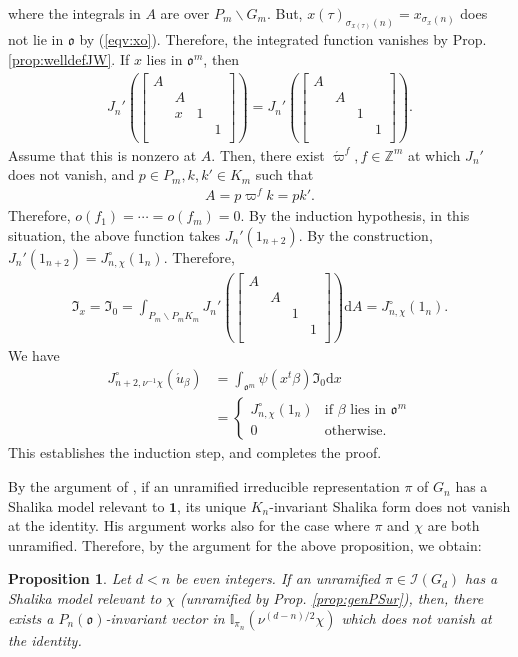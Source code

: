 \documentclass[11pt]{amsart}
\newcommand\s{\sigma}%
\newcommand\Vp{\varpi}%
\newcommand\vp{\varphi}%
\newcommand\oo{\mathfrak{o}}
\newcommand\If{\mathfrak{I}}
\newcommand\dr{\mathrm{d}}
\newcommand\Z{{\mathbb{Z}}}
\newcommand\Ib{{\mathbb{I}}}
\newcommand\1{\mathbf{1}}
\newcommand\ac{\acute}
\newcommand\bs{\backslash}%
\newcommand\Ir{{\mathscr{I}}}
\numberwithin{equation}{section}
\newtheorem{prop}[thm]{Proposition}
\begin{document}
where the integrals in $A$ are over $P_m \bs G_{m}$. 
But, $x(\tau)_{\s_{x(\tau)}(n)} = x_{\s_x(n)}$ does not lie in $\oo$ by (\ref{eqv:xo}).
Therefore, the integrated function vanishes by Prop. \ref{prop:welldefJW}.
If $x$ lies in $\oo^m$, then 
\begin{align*}
J_n'(\begin{bmatrix}
A & & &  \\
&A & & \\
& x & 1 &  \\
& & &1  \\
\end{bmatrix}) = 
J_n'(\begin{bmatrix}
A & & &  \\
&A & & \\
& & 1 &  \\
& & &1  \\
\end{bmatrix}).
\end{align*} 
Assume that this is nonzero at $A$.
Then, there exist $\ac{\Vp}^f, f \in \Z^m$ at which $J_n'$ does not vanish, and $p \in P_m, k,k' \in K_m$ such that 
\begin{align*}
A = p \Vp^f k = p k'.
\end{align*} 
Therefore, $o(f_1) = \cdots = o(f_m) = 0$.
By the induction hypothesis, in this situation, the above function takes $J_n'(1_{n+2})$.
By the construction, $J_n'(1_{n+2}) = J_{n,\chi}^\circ(1_n)$.
Therefore, 
\begin{align*}
\If_x = \If_0 = \int_{P_m \bs P_mK_m} J_n'(\begin{bmatrix}
A & & &  \\
&A & & \\
& & 1 &  \\
& & &1  \\
\end{bmatrix}) \dr A = J_{n,\chi}^\circ(1_n).
\end{align*} 
We have 
\begin{align*}
J_{n+2,\nu^{-1} \chi}^\circ(\ac{u}_\beta) 
&= \int_{\oo^m} \psi(x{}^t\beta)\If_0 \dr x \\
&= \begin{cases}
J_{n,\chi}^\circ(1_n) & \mbox{if $\beta$ lies in $\oo^m$} \\
 0& \mbox{otherwise.} 
\end{cases}
\end{align*} 
This establishes the induction step, and completes the proof.

By the argument of \cite{S}, if an unramified irreducible representation $\pi$ of $G_{n}$ has a Shalika model relevant to $\1$,  its unique $K_{n}$-invariant Shalika form does not vanish at the identity.
His argument works also for the case where $\pi$ and $\chi$ are both unramified.
Therefore, by the argument for the above proposition, we obtain:
\begin{prop}
Let $d < n$ be even integers.
If an unramified $\pi \in \Ir(G_{d})$ has a Shalika model relevant to $\chi$ (unramified by Prop. \ref{prop:genPSur}), then, there exists a $P_{n}(\oo)$-invariant vector in $\Ib_{\pi_{n}}(\nu^{(d-n)/2} \chi)$ which does not vanish at the identity.
\end{prop}
\end{document}
